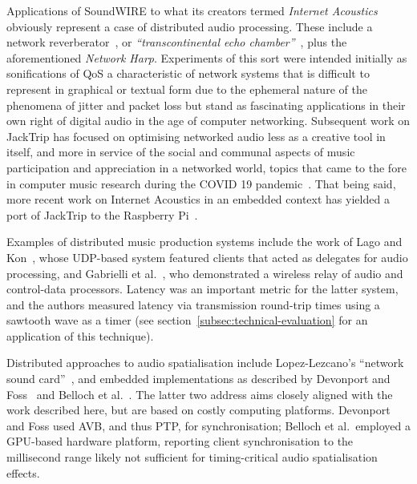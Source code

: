 \documentclass[utf8]{FrontiersinHarvard}
\newcommand{\secref}[1]{section~\ref{#1}}
\begin{document}
    Applications of SoundWIRE to what its creators termed \textit{Internet
    Acoustics}~\citep{chafe_physical_2002} obviously represent a case of
    distributed audio processing.
    These include a network reverberator~\citep{chafe_i_2018}, or
    \textit{``transcontinental echo chamber''}~\citep{chafe_simplified_2000},
    plus the aforementioned \textit{Network Harp}.
    Experiments of this sort were intended initially as sonifications of QoS
    \textemdash{} a characteristic of network systems that is difficult to
    represent in graphical or textual form due to the ephemeral nature of the
    phenomena of jitter and packet loss \textemdash{} but stand as fascinating
    applications in their own right of digital audio in the age of computer
    networking.
    Subsequent work on JackTrip has focused on optimising networked audio less
    as a creative tool in itself, and more in service of the social and communal
    aspects of music participation and appreciation in a networked world, topics
    that came to the fore in computer music research during the
    COVID 19 pandemic~\citep{bosi_experiencing_2021,
        sacchetto_jacktrip-webrtc_2021}.
    That being said, more recent work on Internet Acoustics in an embedded
    context has yielded a port of JackTrip to the Raspberry
    Pi~\citep{chafe_jacktrip_2019}.

    Examples of distributed music production systems include the work of
    Lago and Kon~\citep{lago_middleware_2003}, whose UDP-based system featured
    clients that acted as delegates for audio processing, and Gabrielli et
    al.~\citep{gabrielli_networked_2012}, who demonstrated a wireless relay of
    audio and control-data processors.
    Latency was an important metric for the latter system, and the authors
    measured latency via transmission round-trip times using a sawtooth wave as
    a timer (see \secref{subsec:technical-evaluation} for an application of this
    technique).

    Distributed approaches to audio spatialisation include Lopez-Lezcano's
    ``network sound card''~\citep{lopez-lezcano_jack_2012}, and embedded
    implementations as described by Devonport and
    Foss~\citep{devonport_distribution_2019} and Belloch et
    al.~\citep{belloch_performance_2021}.
    The latter two address aims closely aligned with the work described here,
    but are based on costly computing platforms.
    Devonport and Foss used AVB, and thus PTP, for synchronisation; Belloch et
    al.\ employed a GPU-based hardware platform, reporting client
    synchronisation to the millisecond range \textemdash{} likely not sufficient
    for timing-critical audio spatialisation effects.
\end{document}
